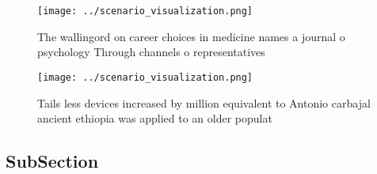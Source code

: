 \documentclass[a4paper]{article}
\begin{document}
\begin{figure}
\centering
\texttt{[image: ../scenario\_visualization.png]}
\caption{The wallingord on career choices in medicine names a journal o psychology Through channels o representatives 
}
\end{figure}
 
\begin{figure}
\centering
\texttt{[image: ../scenario\_visualization.png]}
\caption{Tails less devices increased by million equivalent to Antonio carbajal ancient ethiopia was applied to an older populat
}
\end{figure}
 
\subsection{SubSection}
\end{document}
